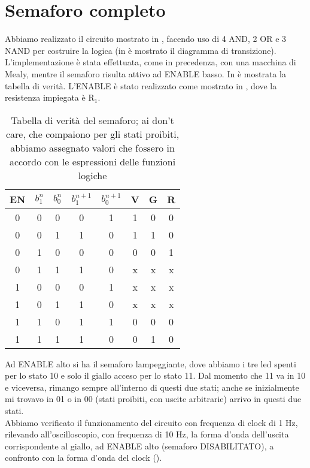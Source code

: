 \section{Semaforo completo}
Abbiamo realizzato il circuito mostrato in , facendo uso di 4 AND, 2 OR e 3 NAND per costruire la logica (in  è mostrato il diagramma di transizione). L'implementazione è stata effettuata, come in precedenza, con una macchina di Mealy, mentre il semaforo risulta attivo ad ENABLE basso. In  è mostrata la tabella di verità. L'ENABLE è stato realizzato come mostrato in , dove la resistenza impiegata è R$_1$.\\
\begin{table}[h]
	\centering
	\begin{tabular}{cccccccc}		
		 EN& $b_{1}^{n}$& $b_{0}^{n}$& $b_{1}^{n+1}$& $b_{0}^{n+1}$ &V & G& R\\
		 \midrule 
		  0 & 0 & 0 & 0 & 1 & 1 & 0 & 0 \\
		  0 & 0 & 1 & 1 & 0 & 1 & 1 & 0 \\
		  0 & 1 & 0 & 0 & 0 & 0 & 0 & 1 \\
          0 & 1 & 1 & 1 & 0 & x & x & x \\
		  1 & 0 & 0 & 0 & 1 & x & x & x \\
		  1 & 0 & 1 & 1 & 0 & x & x & x \\
		  1 & 1 & 0 & 1 & 1 & 0 & 0 & 0 \\
          1 & 1 & 1 & 1 & 0 & 0 & 1 & 0 \\          
 	\end{tabular}
	\caption{ Tabella di verità del semaforo; ai don't care, che compaiono per gli stati proibiti, abbiamo assegnato valori che fossero in accordo con le espressioni delle funzioni logiche }
	\label{t:tabella_verità}
\end{table}
Ad ENABLE alto si ha il semaforo lampeggiante, dove abbiamo i tre led spenti per lo stato 10 e solo il giallo acceso per lo stato 11. Dal momento che 11 va in 10 e viceversa, rimango sempre all'interno di questi due stati; anche se inizialmente mi trovavo in 01 o in 00 (stati proibiti, con uscite arbitrarie) arrivo in questi due stati.\\
Abbiamo verificato il funzionamento del circuito con frequenza di clock di 1 Hz, rilevando all'oscilloscopio, con frequenza di 10 Hz, la forma d'onda dell'uscita corrispondente al giallo, ad ENABLE alto (semaforo DISABILITATO), a confronto con la forma d'onda del clock ().\\
